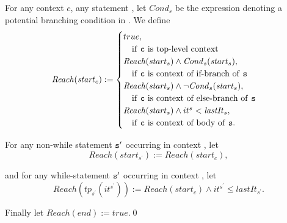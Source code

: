 \begin{definition}
	For any context $c$, any statement , let
	$\mathit{Cond}_{s}$ be the expression denoting a potential
	branching condition in .
	We define 
	\begin{equation*}
	\begin{array}{l}
	\mathit{Reach}(\mathit{start}_c) := 
	\begin{cases}
	true,  \\ \quad \text{if \texttt{c} is top-level context}\\
	\mathit{Reach}(\mathit{start}_{s}) \land \mathit{Cond}_{s}(\mathit{start}_{s}), \\ \quad\text{if \texttt{c} is context of if-branch of \texttt{s}}\\
	\mathit{Reach}(\mathit{start}_{s}) \land \neg\mathit{Cond}_{s}(\mathit{start}_{s}), \\ \quad\text{if \texttt{c} is  context of else-branch of \texttt{s}}\\
	\mathit{Reach}(\mathit{start}_{s}) \land it^{s}< \mathit{lastIt}_{s}, \\ \quad\text{if \texttt{c} is context of body of \texttt{s}}.
	\end{cases}
	\end{array}
	\end{equation*}
	
	
	For any non-while statement $\texttt{s}^\prime$ occurring in 
	context , let
	$$\mathit{Reach}(\mathit{start}_{s^\prime}) := \mathit{Reach}(\mathit{start_c}),$$
	
	and for any while-statement $\texttt{s}^\prime$ occurring in context , let 
	$$\mathit{Reach}(tp_{s^\prime}(it^{s^\prime})) := \mathit{Reach}(\mathit{start}_{c}) \land it^{s^\prime} \leq \mathit{lastIt}_{s^\prime}.$$
	
	Finally let $\mathit{Reach(\mathit{end})}:= true$.\qed
\end{definition}

